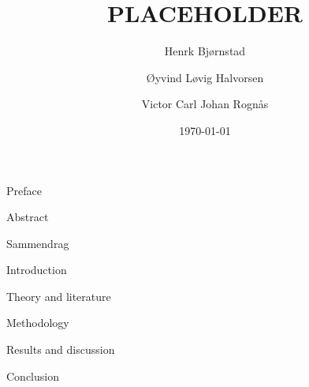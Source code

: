 \documentclass[12pt]{article}
\begin{document}

\author{Henrk Bjørnstad \and Øyvind Løvig Halvorsen \and Victor Carl Johan Rognås}
\title{PLACEHOLDER}
\date{\today}

{Preface}
\newpage

{Abstract}
\newpage

{Sammendrag}
\newpage

\begin{spacing}{0.82} %
    \listoffigures
    \newpage

    \listoftables
    \newpage
    
    \tableofcontents
    \newpage
\end{spacing}

\setcounter{page}{1}
{Introduction}

\newpage
{Theory and literature}

\newpage
{Methodology}

\newpage
{Results and discussion}

\newpage
{Conclusion}

\newpage
\newrefcontext[sorting=nyt]
\printbibliography[heading = bibintoc, title = References]
\end{document}
